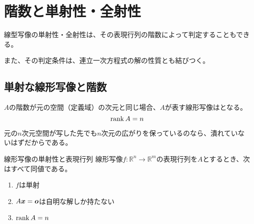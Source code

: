 \documentclass[../../../topic_linear-algebra]{subfiles}
\begin{document}
\sectionline
\section{階数と単射性・全射性}

線型写像の単射性・全射性は、その表現行列の階数によって判定することもできる。

また、その判定条件は、連立一次方程式の解の性質とも結びつく。

\subsection{単射な線形写像と階数}

$A$の階数が元の空間（定義域）の次元と同じ場合、$A$が表す線形写像はとなる。
\begin{equation*}
  \rank A = n
\end{equation*}

元の$n$次元空間が写した先でも$n$次元の広がりを保っているのなら、潰れていないはずだからである。

\begin{theorem}{線形写像の単射性と表現行列}
  線形写像$f\colon \mathbb{R}^n \to \mathbb{R}^m$の表現行列を$A$とするとき、次はすべて同値である。
  \begin{enumerate}[label=\romanlabel]
    \item $f$は単射
    \item $A\vb*{x} = \vb*{o}$は自明な解しか持たない
    \item $\rank A = n$
  \end{enumerate}
\end{theorem}
\end{document}
